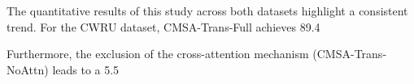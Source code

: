\documentclass[journal]{IEEEtran}
\begin{document}
The quantitative results of this study across both datasets highlight a consistent trend. For the CWRU dataset, CMSA-Trans-Full achieves 89.4%

Furthermore, the exclusion of the cross-attention mechanism (CMSA-Trans-NoAttn) leads to a 5.5%
\end{document}
